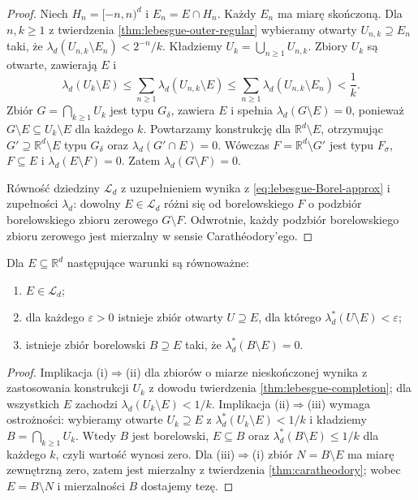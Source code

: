 \begin{proof}
Niech $H_n=[-n,n)^d$ i $E_n=E\cap H_n$.
Każdy $E_n$ ma miarę skończoną.
Dla $n,k\ge1$ z twierdzenia
\ref{thm:lebesgue-outer-regular} wybieramy
otwarty $U_{n,k}\supseteq E_n$ taki, że
$\lambda_d(U_{n,k}\setminus E_n)<2^{-n}/k$.
Kładziemy $U_k=\bigcup_{n\ge1}U_{n,k}$.
Zbiory $U_k$ są otwarte, zawierają $E$ i
\[
\lambda_d(U_k\setminus E)
\le\sum_{n\ge1}\lambda_d(U_{n,k}\setminus E)
\le\sum_{n\ge1}\lambda_d(U_{n,k}\setminus E_n)
<\frac1k.
\]
Zbiór $G=\bigcap_{k\ge1}U_k$ jest typu $G_\delta$,
zawiera $E$ i spełnia $\lambda_d(G\setminus E)=0$,
ponieważ $G\setminus E\subseteq U_k\setminus E$
dla każdego $k$.
Powtarzamy konstrukcję dla $\mathbb R^d\setminus E$,
otrzymując $G'\supseteq\mathbb R^d\setminus E$ typu
$G_\delta$ oraz $\lambda_d(G'\cap E)=0$.
Wówczas $F=\mathbb R^d\setminus G'$ jest typu
$F_\sigma$, $F\subseteq E$ i
$\lambda_d(E\setminus F)=0$. Zatem
$\lambda_d(G\setminus F)=0$.

Równość dziedziny $\mathcal L_d$ z uzupełnieniem
wynika z \eqref{eq:lebesgue-Borel-approx} i
zupełności $\lambda_d$: dowolny $E\in\mathcal L_d$
różni się od borelowskiego $F$ o podzbiór borelowskiego
zbioru zerowego $G\setminus F$. Odwrotnie, każdy
podzbiór borelowskiego zbioru zerowego jest
mierzalny w sensie Carathéodory'ego.
\end{proof}

\begin{wniosek}
\label{cor:lebesgue-regularity-characterization}
Dla $E\subseteq\mathbb R^d$ następujące warunki
są równoważne:
\begin{enumerate}[label=\textup{(\roman*)}]
\item $E\in\mathcal L_d$;
\item dla każdego $\varepsilon>0$ istnieje zbiór
otwarty $U\supseteq E$, dla którego
$\lambda_d^*(U\setminus E)<\varepsilon$;
\item istnieje zbiór borelowski $B\supseteq E$
taki, że $\lambda_d^*(B\setminus E)=0$.
\end{enumerate}
\end{wniosek}

\begin{proof}
Implikacja (i)$\Rightarrow$(ii) dla zbiorów o miarze
nieskończonej wynika z zastosowania konstrukcji
$U_k$ z dowodu twierdzenia
\ref{thm:lebesgue-completion}; dla wszystkich $E$
zachodzi $\lambda_d(U_k\setminus E)<1/k$.
Implikacja (ii)$\Rightarrow$(iii) wymaga ostrożności:
wybieramy otwarte $U_k\supseteq E$ z
$\lambda_d^*(U_k\setminus E)<1/k$ i kładziemy
$B=\bigcap_{k\ge1}U_k$. Wtedy $B$ jest borelowski,
$E\subseteq B$ oraz
$\lambda_d^*(B\setminus E)\le1/k$ dla każdego $k$,
czyli wartość wynosi zero.
Dla (iii)$\Rightarrow$(i) zbiór $N=B\setminus E$
ma miarę zewnętrzną zero, zatem jest mierzalny
z twierdzenia \ref{thm:caratheodory}; wobec
$E=B\setminus N$ i mierzalności $B$ dostajemy tezę.
\end{proof}

